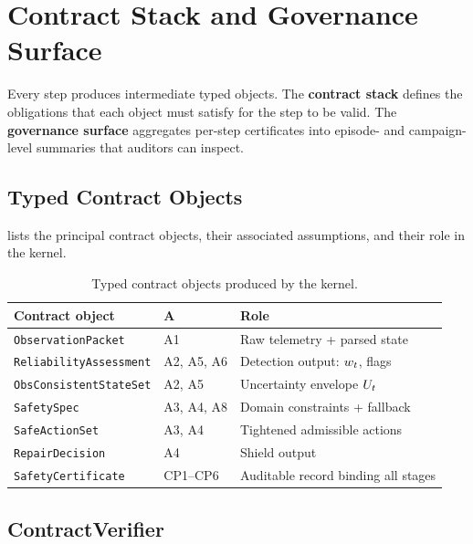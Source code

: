 \section{Contract Stack and Governance Surface}\label{sec:contracts}

Every \dcs{} step produces intermediate typed objects.  The \textbf{contract stack}
defines the obligations that each object must satisfy for the step to be valid.  The
\textbf{governance surface} aggregates per-step certificates into episode- and
campaign-level summaries that auditors can inspect.

\subsection{Typed Contract Objects}

 lists the principal contract objects, their
associated assumptions, and their role in the kernel.

\begin{table}[t]
\caption{Typed contract objects produced by the \dcs{} kernel.}
\label{tab:contract_objects}
\centering\scriptsize
\setlength{\tabcolsep}{2.5pt}
\renewcommand{\arraystretch}{1.08}
\begin{tabularx}{\linewidth}{p{2.7cm}p{1.25cm}X}
\toprule
\textbf{Contract object} & \textbf{A} & \textbf{Role} \\
\midrule
\texttt{ObservationPacket}            & A1       & Raw telemetry + parsed state \\
\texttt{ReliabilityAssessment}        & A2, A5, A6 & Detection output: $w_t$, flags \\
\texttt{ObsConsistentStateSet} & A2, A5   & Uncertainty envelope $U_t$ \\
\texttt{SafetySpec}                   & A3, A4, A8 & Domain constraints + fallback \\
\texttt{SafeActionSet}                & A3, A4   & Tightened admissible actions \\
\texttt{RepairDecision}              & A4       & Shield output \\
\texttt{SafetyCertificate}           & CP1--CP6 & Auditable record binding all stages \\
\bottomrule
\end{tabularx}
\end{table}

\subsection{ContractVerifier}

